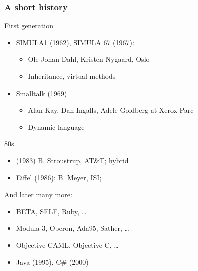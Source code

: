 \documentclass{beamer}
\begin{document}
\begin{frame}[fragile]
\frametitle{A short history}
First generation
\begin{itemize}
\item SIMULA1 (1962), SIMULA 67 (1967): 
\begin{itemize}
\item Ole-Johan Dahl, Kristen Nygaard, Oslo
\item Inheritance, virtual methods
\end{itemize}
\item Smalltalk (1969) 
\begin{itemize}
\item Alan Kay, Dan Ingalls, Adele Goldberg at Xerox Parc
\item Dynamic language %
\end{itemize}
\end{itemize}

80s
\begin{itemize}
\item \cpp(1983)
B. Stroustrup, AT\&T; hybrid
\item Eiffel (1986); B. Meyer, ISI; %

\end{itemize}

And later many more:
\begin{itemize}
\item BETA, SELF, Ruby, \ldots
\item Modula-3, Oberon, Ada95, Sather, \ldots
\item Objective CAML, Objective-C, \ldots
\item Java (1995), C\# (2000)


\end{itemize}

\end{frame}
\end{document}
